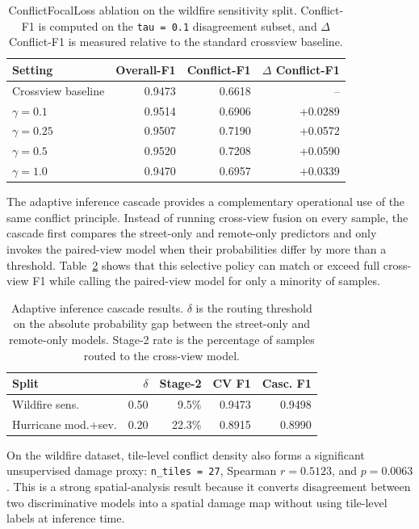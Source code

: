 \documentclass[sigconf]{acmart}
\begin{document}
\begin{table}[!tbp]
  \caption{ConflictFocalLoss ablation on the wildfire sensitivity split.
  Conflict-F1 is computed on the \texttt{tau = 0.1} disagreement subset, and
  $\Delta$ Conflict-F1 is measured relative to the standard crossview baseline.}
  \label{tab:cfl}
  \centering
  \begin{tabular}{lrrr}
    \toprule
    Setting & Overall-F1 & Conflict-F1 & $\Delta$ Conflict-F1 \\
    \midrule
    Crossview baseline & 0.9473 & 0.6618 & -- \\
    $\gamma=0.1$ & 0.9514 & 0.6906 & +0.0289 \\
    $\gamma=0.25$ & 0.9507 & 0.7190 & +0.0572 \\
    $\gamma=0.5$ & 0.9520 & 0.7208 & +0.0590 \\
    $\gamma=1.0$ & 0.9470 & 0.6957 & +0.0339 \\
    \bottomrule
  \end{tabular}
\end{table}

The adaptive inference cascade provides a complementary operational use of the
same conflict principle. Instead of running cross-view fusion on every sample,
the cascade first compares the street-only and remote-only predictors and only
invokes the paired-view model when their probabilities differ by more than a
threshold. Table~\ref{tab:cascade} shows that this selective policy can match
or exceed full cross-view F1 while calling the paired-view model for only a
minority of samples.

\begin{table}[!tbp]
  \caption{Adaptive inference cascade results. $\delta$ is the routing
  threshold on the absolute probability gap between the street-only and
  remote-only models. Stage-2 rate is the percentage of samples routed to the
  cross-view model.}
  \label{tab:cascade}
  \centering
  \small
  \setlength{\tabcolsep}{4pt}
  \begin{tabular}{lrrrr}
    \toprule
    Split & $\delta$ & Stage-2 & CV F1 & Casc. F1 \\
    \midrule
    Wildfire sens. & 0.50 & 9.5\% & 0.9473 & 0.9498 \\
    Hurricane mod.+sev. & 0.20 & 22.3\% & 0.8915 & 0.8990 \\
    \bottomrule
  \end{tabular}
\end{table}


On the wildfire dataset, tile-level conflict density also forms a significant
unsupervised damage proxy: \texttt{n\_tiles = 27}, Spearman
$r = 0.5123$, and $p = 0.0063$. This is a strong spatial-analysis result because
it converts disagreement between two discriminative models into a spatial damage
map without using tile-level labels at inference time.
\end{document}
